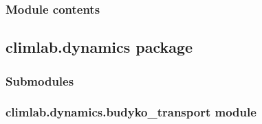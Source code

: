 \documentclass[letterpaper,10pt,english]{sphinxmanual}
\begin{document}
\subsubsection{Module contents}
\label{api/climlab.domain:module-contents}\label{api/climlab.domain:module-climlab.domain}

\subsection{climlab.dynamics package}
\label{api/climlab.dynamics:climlab-dynamics-package}\label{api/climlab.dynamics::doc}

\subsubsection{Submodules}
\label{api/climlab.dynamics:submodules}

\subsubsection{climlab.dynamics.budyko\_transport module}
\label{api/climlab.dynamics:module-climlab.dynamics.budyko_transport}\label{api/climlab.dynamics:climlab-dynamics-budyko-transport-module}
\end{document}
